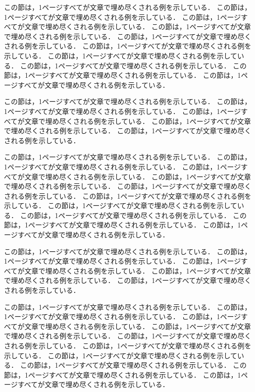この節は，1ページすべてが文章で埋め尽くされる例を示している．
この節は，1ページすべてが文章で埋め尽くされる例を示している．
この節は，1ページすべてが文章で埋め尽くされる例を示している．
この節は，1ページすべてが文章で埋め尽くされる例を示している．
この節は，1ページすべてが文章で埋め尽くされる例を示している．
この節は，1ページすべてが文章で埋め尽くされる例を示している．
この節は，1ページすべてが文章で埋め尽くされる例を示している．
この節は，1ページすべてが文章で埋め尽くされる例を示している．
この節は，1ページすべてが文章で埋め尽くされる例を示している．
この節は，1ページすべてが文章で埋め尽くされる例を示している．

この節は，1ページすべてが文章で埋め尽くされる例を示している．
この節は，1ページすべてが文章で埋め尽くされる例を示している．
この節は，1ページすべてが文章で埋め尽くされる例を示している．
この節は，1ページすべてが文章で埋め尽くされる例を示している．
この節は，1ページすべてが文章で埋め尽くされる例を示している．

この節は，1ページすべてが文章で埋め尽くされる例を示している．
この節は，1ページすべてが文章で埋め尽くされる例を示している．
この節は，1ページすべてが文章で埋め尽くされる例を示している．
この節は，1ページすべてが文章で埋め尽くされる例を示している．
この節は，1ページすべてが文章で埋め尽くされる例を示している．
この節は，1ページすべてが文章で埋め尽くされる例を示している．
この節は，1ページすべてが文章で埋め尽くされる例を示している．
この節は，1ページすべてが文章で埋め尽くされる例を示している．
この節は，1ページすべてが文章で埋め尽くされる例を示している．
この節は，1ページすべてが文章で埋め尽くされる例を示している．

この節は，1ページすべてが文章で埋め尽くされる例を示している．
この節は，1ページすべてが文章で埋め尽くされる例を示している．
この節は，1ページすべてが文章で埋め尽くされる例を示している．
この節は，1ページすべてが文章で埋め尽くされる例を示している．
この節は，1ページすべてが文章で埋め尽くされる例を示している．

この節は，1ページすべてが文章で埋め尽くされる例を示している．
この節は，1ページすべてが文章で埋め尽くされる例を示している．
この節は，1ページすべてが文章で埋め尽くされる例を示している．
この節は，1ページすべてが文章で埋め尽くされる例を示している．
この節は，1ページすべてが文章で埋め尽くされる例を示している．
この節は，1ページすべてが文章で埋め尽くされる例を示している．
この節は，1ページすべてが文章で埋め尽くされる例を示している．
この節は，1ページすべてが文章で埋め尽くされる例を示している．
この節は，1ページすべてが文章で埋め尽くされる例を示している．
この節は，1ページすべてが文章で埋め尽くされる例を示している．


